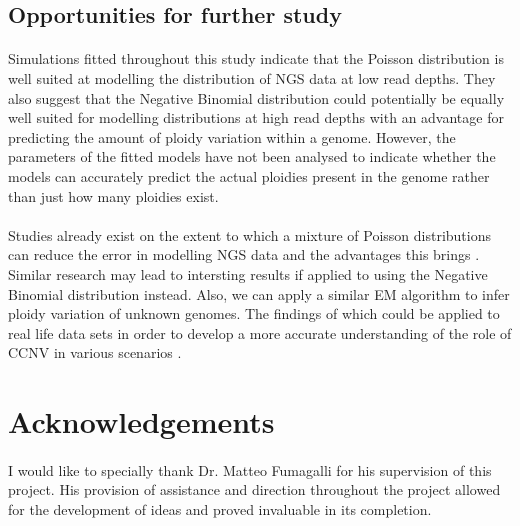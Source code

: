 \documentclass[11pt]{article}
\begin{document}
\subsection{Opportunities for further study}
\paragraph{}Simulations fitted throughout this study indicate that the Poisson distribution is well suited at modelling the distribution of NGS data at low read depths. They also suggest that the Negative Binomial distribution could potentially be equally well suited for modelling distributions at high read depths with an advantage for predicting the amount of ploidy variation within a genome. However, the parameters of the fitted models have not been analysed to indicate whether the models can accurately predict the actual ploidies present in the genome rather than just how many ploidies exist. \\
\paragraph{}Studies already exist on the extent to which a mixture of Poisson distributions can reduce the error in modelling NGS data and the advantages this brings \autocite{Schwarzbauer2010}. Similar research may lead to intersting results if applied to using the Negative Binomial distribution instead. Also, we can apply a similar EM algorithm to infer ploidy variation of unknown genomes. The findings of which could be applied to real life data sets in order to develop a more accurate understanding of the role of CCNV in various scenarios \autocite{Farrer2013,Yan2017}.\\

\section{Acknowledgements}
\paragraph{}I would like to specially thank Dr. Matteo Fumagalli for his supervision of this project. His provision of assistance and direction throughout the project allowed for the development of ideas and proved invaluable in its completion.
\pagebreak 
\printbibliography
\pagebreak
\end{document}
